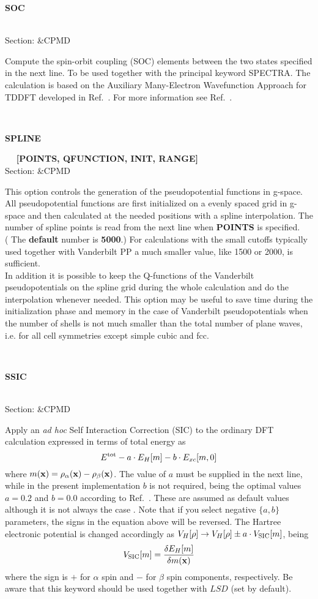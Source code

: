 \documentclass[twoside,10pt,titlepage,a4paper]{article}
\newcommand{\reflabel}[1]{\hypertarget{#1}}
\newcommand{\reflabel}[1]{\label{#1}}
\newcommand{\keyword}[5]{%
\vspace{1.0cm}
\begin{minipage}{15cm}
\reflabel{#1}{\textbf{\large #1}}%
\index{#1}%
\ \textbf{#2}%
\ \textbf{#3}%
\ \textit{#4}%
     \hfill\\\smallskip
     {Section: #5}
     \hfill\\\smallskip\vskip 10pt
\end{minipage}
}%
\newcommand{\desc}[1]{%
   \hspace*{\fill} \parbox{130mm}{\sloppy
                          {#1}%
                             }
     \hfill\\\smallskip
   }%
\newcommand{\desc}[1]{#1\vspace{1ex}}
\begin{document}
\keyword{SOC}{}{}{}{\&CPMD}
 \desc{Compute the spin-orbit coupling (SOC) elements between the two states specified in the next line.
       To be used together with the principal keyword SPECTRA.
       The calculation is based on the Auxiliary Many-Electron Wavefunction Approach for TDDFT developed
       in Ref.~\cite{taver}. For more information see Ref.~\cite{SOC}.}

\keyword{SPLINE}{}{[POINTS, QFUNCTION, INIT, RANGE]}{}{\&CPMD}
  \desc{This option controls the generation of the pseudopotential
      functions in g-space. \\
      All pseudopotential functions are first initialized on a evenly
      spaced grid in g-space and then calculated at the needed
      positions with a spline interpolation.
      The number of spline points is read from the next
      line when {\bf POINTS} is specified. \\
      ( The {\bf default} number is {\bf 5000}.)
      For calculations with the small cutoffs typically used together with
      Vanderbilt PP a much smaller value, like 1500 or 2000, is sufficient. \\
      In addition it is possible to keep the Q-functions of
      the Vanderbilt pseudopotentials on the spline grid during
      the whole calculation and do the interpolation whenever needed.
      This option may be useful to save
      time during the initialization phase and memory in the case of
      Vanderbilt pseudopotentials when the number of
      shells is not much smaller
      than the total number of plane waves, i.e. for all cell
      symmetries except simple cubic and fcc.}

\keyword{SSIC}{}{}{}{\&CPMD}
  \desc{Apply an {\it ad hoc} Self Interaction Correction (SIC) to the 
        ordinary DFT calculation expressed in terms of total energy as
        \begin{equation*}
        E^{\rm tot}-a\cdot  E_H[m]- b\cdot E_{xc}[m, 0]
        \end{equation*}
        where $m({\bf x}) = \rho_\alpha({\bf x})-\rho_\beta({\bf x})$.
        The value of $a$ must be supplied in the next line, while
        in the present implementation $b$ is not required, being
        the optimal values $a=0.2$ and $b=0.0$ according to
        Ref.~\cite{SSIC}. These are assumed as default values
        although it is not always the case \cite{dna_sic}.
        Note that if you select negative $\{a, b \}$ parameters,
        the signs in the equation above will be reversed.
        The Hartree electronic potential is changed accordingly
        as $V_H[\rho] \to V_H[\rho] \pm a\cdot V_{\rm SIC}[m]$,
        being
        \begin{equation*}
        V_{\rm SIC}[m]=\frac{\delta E_H[m]}{\delta m({\bf x})}
        \end{equation*}
        where the sign is $+$ for $\alpha$ spin and $-$ for
        $\beta$ spin components, respectively.
        Be aware that this keyword should be used together with
        $LSD$ (set by default).}
\end{document}
